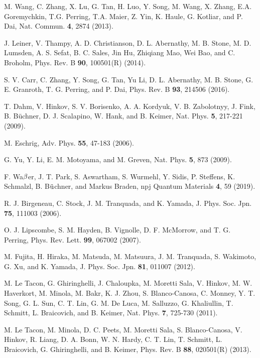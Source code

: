 \documentclass[aps,prl,onecolumn,amsmath,amssymb,superscriptaddress]{revtex4}
\begin{document}
\begin{thebibliography}{}
 M. Wang, C. Zhang, X. Lu, G. Tan, H. Luo, Y. Song, M. Wang, X. Zhang, E.A. Goremychkin, T.G. Perring, T.A. Maier, Z. Yin, K. Haule, G. Kotliar, and P. Dai, Nat. Commun. {\bf 4}, 2874 (2013). 

 J. Leiner, V. Thampy, A. D. Christianson, D. L. Abernathy, M. B. Stone, M. D. Lumsden, A. S. Sefat, B. C. Sales, Jin Hu, Zhiqiang Mao, Wei Bao, and C. Broholm, Phys. Rev. B {\bf 90}, 100501(R) (2014).

 S. V. Carr, C. Zhang, Y. Song, G. Tan, Yu Li, D. L. Abernathy, M. B. Stone, G. E. Granroth, T. G. Perring, and P. Dai, Phys. Rev. B {\bf 93}, 214506 (2016).

 T. Dahm, V. Hinkov, S. V. Borisenko, A. A. Kordyuk, V. B. Zabolotnyy, J. Fink, B. B\"{u}chner,
D. J. Scalapino, W. Hank, and B. Keimer, Nat. Phys. {\bf 5}, 217-221 (2009).

 M. Eschrig, Adv. Phys. {\bf 55}, 47-183 (2006).

 G. Yu, Y. Li, E. M. Motoyama, and M. Greven, Nat. Phys. {\bf 5}, 873 (2009).

 F. Wa$\rm \beta$er, J. T. Park, S. Aswartham, S. Wurmehl, Y. Sidis, P. Steffens, K. Schmalzl, B. B$\rm \ddot{u}$chner, and Markus Braden, 
npj Quantum Materials {\bf 4}, 59 (2019). 

 R. J. Birgeneau, C. Stock, J. M. Tranquada, and K. Yamada, J. Phys. Soc. Jpn. {\bf 75}, 111003 (2006).

 O. J. Lipscombe, S. M. Hayden, B. Vignolle, D. F. McMorrow, and T. G. Perring, Phys. Rev. Lett. {\bf 99}, 067002 (2007).

 M. Fujita, H. Hiraka, M. Matsuda, M. Matsuura, J. M. Tranquada, S. Wakimoto, G. Xu, and K. Yamada, J. Phys. Soc. Jpn. {\bf 81}, 011007 (2012).

 M. Le Tacon, G. Ghiringhelli, J. Chaloupka, M. Moretti Sala, V. Hinkov, M. W. Haverkort, M. Minola, M. Bakr, K. J. Zhou, S. Blanco-Canosa, C. Monney, Y. T. Song, G. L. Sun, C. T. Lin, G. M. De Luca, M. Salluzzo, G. Khaliullin, T. Schmitt, L. Braicovich, and B. Keimer, Nat. Phys. {\bf 7}, 725-730 (2011).

 M. Le Tacon, M. Minola, D. C. Peets, M. Moretti Sala, S. Blanco-Canosa, V. Hinkov, R. Liang, D. A. Bonn, W. N. Hardy, C. T. Lin, T. Schmitt, L. Braicovich, G. Ghiringhelli, and B. Keimer, Phys. Rev. B {\bf 88}, 020501(R) (2013).


\end{thebibliography}
\end{document}
